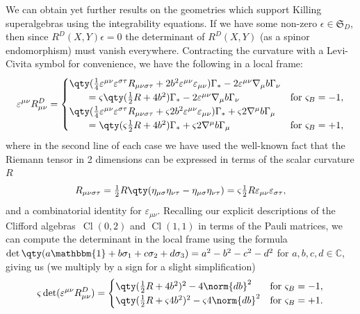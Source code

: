 \documentclass[pdftex]{sigma}
\numberwithin{equation}{section}
\newcommand{\fS}{\mathfrak{S}}
\newcommand{\CC}{\mathbb{C}}
\newcommand{\1}{\mathbbm{1}}
\DeclareMathOperator{\Cl}{Cl}
\begin{document}
We can obtain yet further results on the geometries which support Killing superalgebras using the integrability equations. If we have some non-zero $\epsilon\in\fS_D$, then since $R^D(X,Y)\epsilon=0$ the determinant of $R^D(X,Y)$ (as a spinor endomorphism) must vanish everywhere. Contracting the curvature with a Levi-Civita symbol for convenience, we have the following in a local frame:
\begin{equation}\label{eq:2d-D-curvature-comps}
	\varepsilon^{\mu\nu}R^D_{\mu\nu} =
		\begin{cases}
			\qty(\frac{1}{4}\varepsilon^{\mu\nu}\varepsilon^{\sigma\tau}R_{\mu\nu\sigma\tau} + 2b^2\varepsilon^{\mu\nu}\varepsilon_{\mu\nu})\Gamma_* - 2\varepsilon^{\mu\nu}\nabla_\mu b\Gamma_\nu
			\\
			\qquad=\varsigma\qty(\frac{1}{2}R + 4b^2)\Gamma_* - 2\varepsilon^{\mu\nu}\nabla_\mu b\Gamma_\nu
				& \text{for } \varsigma_B=-1,
			\\	
			\qty(\frac{1}{4}\varepsilon^{\mu\nu}\varepsilon^{\sigma\tau}R_{\mu\nu\sigma\tau} + \varsigma 2b^2\varepsilon^{\mu\nu}\varepsilon_{\mu\nu})\Gamma_* + \varsigma2\nabla^\mu b\Gamma_\mu
			\\
			\qquad= \qty(\varsigma\frac{1}{2}R + 4b^2)\Gamma_* + \varsigma 2\nabla^\mu b\Gamma_\mu
				& \text{for } \varsigma_B=+1,
		\end{cases}
\end{equation}
where in the second line of each case we have used the well-known fact that the Riemann tensor in 2 dimensions can be expressed in terms of the scalar curvature $R$
\[
	R_{\mu\nu\sigma\tau}=\tfrac{1}{2}R\qty(\eta_{\mu\sigma}\eta_{\nu\tau}-\eta_{\mu\sigma}\eta_{\nu\tau}) =\varsigma\tfrac{1}{2}R\varepsilon_{\mu\nu}\varepsilon_{\sigma\tau},
\]
and a combinatorial identity for $\varepsilon_{\mu\nu}$. Recalling our explicit descriptions of the Clifford algebras~$\Cl(0,2)$ and $\Cl(1,1)$ in terms of the Pauli matrices, we can compute the determinant in the local frame using the formula
$\det\qty(a\1 + b\sigma_1 + c\sigma_2 + d\sigma_3) = a^2 - b^2 - c^2 - d^2
$
for $a,b,c,d\in\CC$, giving us (we multiply by a sign for a slight simplification)
\begin{equation}\label{eq:2d-real-curv-det}
	\varsigma\det(\varepsilon^{\mu\nu}R^D_{\mu\nu}) =
		\begin{cases}
			\qty(\frac{1}{2}R + 4b^2)^2 - 4\norm{db}^2
				& \text{for } \varsigma_B=-1,
			\\	
			\qty(\frac{1}{2}R + \varsigma 4b^2)^2 - \varsigma 4\norm{db}^2
				& \text{for } \varsigma_B=+1.
		\end{cases}
\end{equation}
\end{document}
